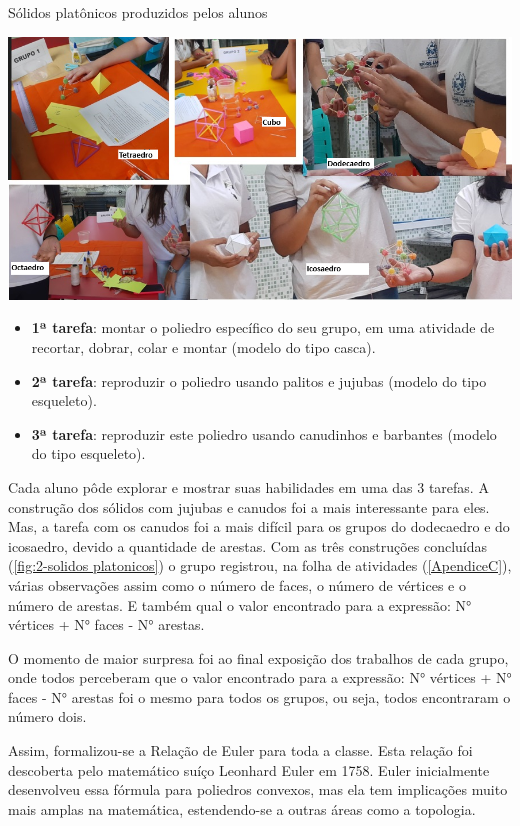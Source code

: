 \begin{CenteredFigure}
    \caption{Sólidos platônicos produzidos pelos alunos} \label{fig:2-solidos platonicos}
    \includegraphics[width=0.8\linewidth]{Imagens/Novas imagens/Sólidos Platônicos compilado}
    \legend{\autoria}
\end{CenteredFigure}

\begin{itemize}
    \item \textbf{1ª tarefa}:  montar o poliedro específico do seu grupo, em uma atividade de recortar, dobrar, colar e montar (modelo do tipo casca).
    \item \textbf{2ª tarefa}: reproduzir o poliedro usando palitos e jujubas (modelo do tipo esqueleto).
    \item \textbf{3ª tarefa}: reproduzir este poliedro usando canudinhos e barbantes (modelo do tipo esqueleto).
\end{itemize}

Cada aluno pôde explorar e mostrar suas habilidades em uma das 3 tarefas. A construção dos sólidos com jujubas e canudos foi a mais interessante para eles. Mas, a tarefa com os canudos foi a mais difícil para os grupos do dodecaedro e do icosaedro, devido a quantidade de arestas. Com as três construções concluídas (\autoref{fig:2-solidos platonicos}) o grupo registrou, na folha de atividades (\autoref{ApendiceC}), várias observações assim como o número de faces, o número de vértices e o número de arestas. E também qual o valor encontrado para a expressão: N° vértices + N° faces - N° arestas.

O momento de maior surpresa foi ao final exposição dos trabalhos de cada grupo, onde todos perceberam que o valor encontrado para a expressão: N° vértices + N° faces - N° arestas foi o mesmo para todos os grupos, ou seja, todos encontraram o número dois.

Assim, formalizou-se a Relação de Euler para toda a classe. Esta relação foi descoberta pelo matemático suíço Leonhard Euler em 1758. Euler inicialmente desenvolveu essa fórmula para poliedros convexos, mas ela tem implicações muito mais amplas na matemática, estendendo-se a outras áreas como a topologia.

